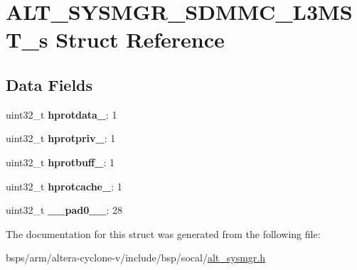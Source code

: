 \hypertarget{structALT__SYSMGR__SDMMC__L3MST__s}{}\section{A\+L\+T\+\_\+\+S\+Y\+S\+M\+G\+R\+\_\+\+S\+D\+M\+M\+C\+\_\+\+L3\+M\+S\+T\+\_\+s Struct Reference}
\label{structALT__SYSMGR__SDMMC__L3MST__s}
\subsection*{Data Fields}
\begin{DoxyCompactItemize}
\item 
\mbox{\label{structALT__SYSMGR__SDMMC__L3MST__s_aedd39f9f804c5bf88d9f552ead5f05b7}} 
uint32\+\_\+t {\bfseries hprotdata\+\_}\+: 1
\item 
\mbox{\label{structALT__SYSMGR__SDMMC__L3MST__s_af4a3e50976354d6366271858e7b5d64c}} 
uint32\+\_\+t {\bfseries hprotpriv\+\_}\+: 1
\item 
\mbox{\label{structALT__SYSMGR__SDMMC__L3MST__s_a47a8c771916bbd7d2e7653954c755ba5}} 
uint32\+\_\+t {\bfseries hprotbuff\+\_}\+: 1
\item 
\mbox{\label{structALT__SYSMGR__SDMMC__L3MST__s_a907c6bc86c8a2817ce6473faa047c417}} 
uint32\+\_\+t {\bfseries hprotcache\+\_}\+: 1
\item 
\mbox{\label{structALT__SYSMGR__SDMMC__L3MST__s_ab4148802be94a6bdfbb41d34a218623c}} 
uint32\+\_\+t {\bfseries \+\_\+\+\_\+pad0\+\_\+\+\_\+}\+: 28
\end{DoxyCompactItemize}


The documentation for this struct was generated from the following file\+:\begin{DoxyCompactItemize}
\item 
bsps/arm/altera-\/cyclone-\/v/include/bsp/socal/\mbox{\hyperlink{alt__sysmgr_8h}{alt\+\_\+sysmgr.\+h}}\end{DoxyCompactItemize}
